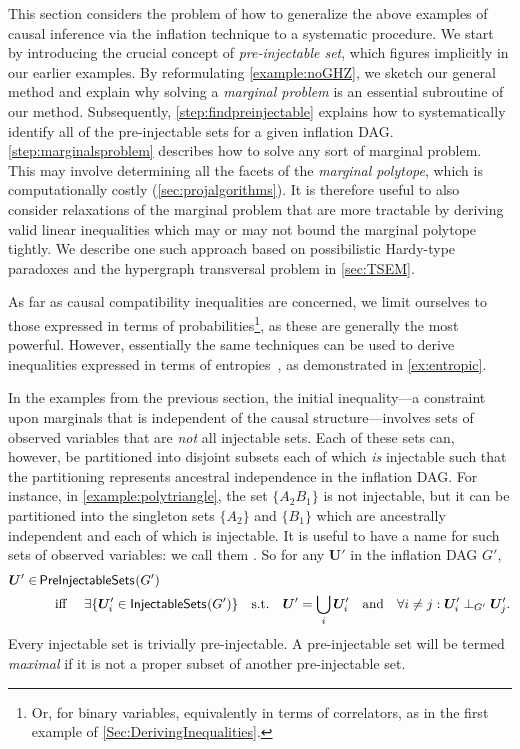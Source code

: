 \documentclass[aps,english,superscriptaddress,onecolumn,twoside,longbibliography,pra,floatfix,fleqn,nofootinbib]{revtex4-1}%
\newcommand*{\tblue}[1]{{\color{MidnightBlue}{\textbf{#1}}}}
\theoremstyle{definition}
\newcounter{example}[section]
\newcommand{\SmallNamedFunction}[3][]{\operatorname{\mathsf{#2}}_{#1}\parenths{#3}}
\newcommand{\aindep}{\perp} %
\DeclarePairedDelimiter{\parenths}{\lparen}{\rparen}
\begin{document}
This section considers the problem of how to generalize the above examples of causal inference via the inflation technique to a systematic procedure. We start by introducing the crucial concept of \emph{pre-injectable set}, which figures implicitly in our earlier examples. By reformulating \cref{example:noGHZ}, we sketch our general method and explain why solving a \emph{marginal problem} is an essential subroutine of our method. Subsequently, \cref{step:findpreinjectable} explains how to systematically identify all of the pre-injectable sets for a given inflation DAG. \cref{step:marginalsproblem} describes how to solve any sort of marginal problem. This may involve determining all the facets of the \emph{marginal polytope}, which is computationally costly (\cref{sec:projalgorithms}).  It is therefore useful to also consider relaxations of the marginal problem that are more tractable by deriving valid linear inequalities which may or may not bound the marginal polytope tightly. We describe one such approach based on possibilistic Hardy-type paradoxes and the hypergraph transversal problem in \cref{sec:TSEM}.

As far as causal compatibility inequalities are concerned, we limit ourselves to those expressed in terms of probabilities\footnote{Or, for binary variables, equivalently in terms of correlators, as in the first example of \cref{Sec:DerivingInequalities}.}, as these are generally the most powerful. However, essentially the same techniques can be used to derive inequalities expressed in terms of entropies~\cite{fritz2013marginal}, as demonstrated in \cref{ex:entropic}. 

In the examples from the previous section, the initial inequality---a constraint upon marginals that is independent of the causal structure---involves sets of observed variables that are \emph{not} all injectable sets.  Each of these sets can, however, be partitioned into disjoint subsets each of which {\em is} injectable such that the partitioning represents ancestral independence in the inflation DAG. For instance, in \cref{example:polytriangle}, the set $\{ A_2 B_1\}$ is not injectable, but it can be partitioned into the singleton sets $\{ A_2 \}$ and $\{ B_1\}$ which are ancestrally independent and each of which is injectable.  It is useful to have a name for such sets of observed variables: we call them \tblue{pre-injectable}. So for any $\bm{U}'$ in the inflation DAG $G'$,
\begin{align}\label{eq:defpreinj}
\begin{split}
\bm{U}'\in & \SmallNamedFunction{PreInjectableSets}{G'} \\
	& \quad\text{ iff }\quad  \exists \{ \bm{U}'_i \in \SmallNamedFunction{InjectableSets}{G'} \} \quad \text{s.t.}\quad \bm{U}'=\bigcup_i \bm{U}'_i  \quad\text{and} \quad  \forall i\ne j: \bm{U}'_i \aindep_{G'} \bm{U}'_j.
\end{split}
\end{align}
Every injectable set is trivially pre-injectable.  A pre-injectable set will be termed \emph{maximal} if it is not a proper subset of another pre-injectable set.
\end{document}
